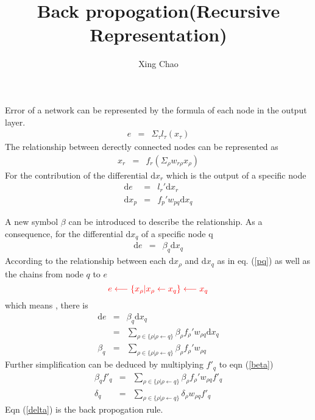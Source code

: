 \documentclass{article}
\newcommand{\mathd}{\mathrm{d}}
\newcommand{\tmcolor}[2]{{\color{#1}{#2}}}
\begin{document}
\title{Back propogation(Recursive Representation)}

\author{
  
  \and
  Xing Chao
}

\maketitle

Error of a network can be represented by the formula of each node in the
output layer.
\begin{eqnarray*}
  e & = & \Sigma_{\tau} l_{\tau} (x_{\tau})
\end{eqnarray*}
The relationship between derectly connected nodes can be represented as
\begin{eqnarray*}
  x_r & = & f_r (\Sigma_{\rho} w_{r \rho} x_{\rho})
\end{eqnarray*}
For the contribution of the differential $\mathd x_r$ which is the output of a
specific node
\begin{eqnarray}
  \mathd e & = & l_r' \mathd x_r \nonumber\\
  \mathd x_p & = & f_p' w_{p q} \mathd x_q  \label{pq}
\end{eqnarray}


A new symbol $\beta$ can be introduced to describe the relationship. As a
consequence, for the differential $\mathd x_q$ of a specific node q
\begin{eqnarray*}
  \mathd e & = & \beta_q \mathd x_q
\end{eqnarray*}
According to the relationship between each $\mathd x_{\rho}$ and $\mathd x_q$
as in eq. (\ref{pq}) as well as the chains from node $q$ to $e$
\[ \tmcolor{red}{e \longleftarrow \{ x_{\rho} |x_{\rho} \leftarrow x_q \}
   \longleftarrow x_q} \]
which means \tmcolor{red}{there is a different chain from $q$ to $e$ through
different node $\rho$}, there is
\begin{eqnarray}
  \mathd e & = & \beta_q \mathd x_q \nonumber\\
  & = & \sum_{\rho \in \{ \rho | \rho \leftarrow q \}} \beta_{\rho} f_{\rho}'
  w_{\rho q} \mathd x_q \nonumber\\
  \beta_q & = & \sum_{\rho \in \{ \rho | \rho \leftarrow q \}} \beta_{\rho}
  f_{\rho}' w_{\rho q}  \label{beta}
\end{eqnarray}
Further simplification can be deduced by multiplying $f'_q$ to eqn
(\ref{beta})
\begin{eqnarray}
  \beta_q f'_q & = & \sum_{\rho \in \{ \rho | \rho \leftarrow q \}}
  \beta_{\rho} f_{\rho}' w_{\rho q} f'_q \nonumber\\
  \delta_q & = & \sum_{\rho \in \{ \rho | \rho \leftarrow q \}} \delta_{\rho}
  w_{\rho q} f'_q  \label{delta}
\end{eqnarray}
Eqn (\ref{delta}) is the back propogation rule.
\end{document}
